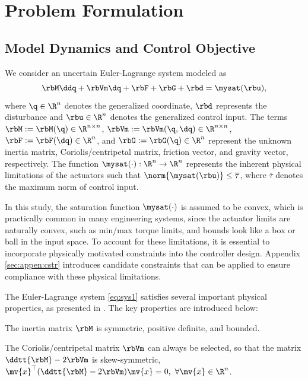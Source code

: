 \documentclass[journal]{IEEEtran}
\begin{document}
\section{Problem Formulation}\label{sec:Problem Formulation}

\subsection{Model Dynamics and Control Objective}

We consider an uncertain Euler-Lagrange system modeled as
\begin{equation}
    \rbM\ddq +\rbVm \dq+ \rbF + \rbG + \rbd
    =
    \mysat(\rbu)
    ,
    \label{eq:sys1}
\end{equation}
where $\q\in \R^n$ denotes the generalized coordinate, $\rbd$ represents the disturbance and $\rbu\in\R^n$ denotes the generalized control input. 
The terms $\rbM:=\rbM(\q)\in\R^{n\times n}$, $\rbVm:=\rbVm(\q,\dq)\in\R^{n\times n}$, $\rbF:=\rbF(\dq)\in\R^{n}$, and $\rbG:=\rbG(\q)\in\R^{n}$ represent the unknown inertia matrix, Coriolis/centripetal matrix, friction vector, and gravity vector, respectively.
The function $\mysat(\cdot):\R^n\to\R^n$ represents the inherent physical limitations of the actuators such that $\norm{\mysat(\rbu)}\le \overline\tau$, where $\overline\tau$ denotes the maximum norm of control input.

In this study, the saturation function $\mysat(\cdot)$ is assumed to be convex, which is practically common in many engineering systems, since the actuator limits are naturally convex, such as min/max torque limits, and bounds look like a box or ball in the input space.
To account for these limitations, it is essential to incorporate physically motivated constraints into the controller design.
Appendix \ref{sec:appen:cstr} introduces candidate constraints that can be applied to ensure compliance with these physical limitations.

The Euler-Lagrange system \eqref{eq:sys1} satisfies several important physical properties, as presented in \cite[Chap. 3 Tab. 3.2.1]{Lewis:1998aa}. 
The key properties are introduced below:
\begin{prop} 
    The inertia matrix $\rbM$ is symmetric, positive definite, and bounded.
    \label{prop:M}
\end{prop}

\begin{prop} 
    The Coriolis/centripetal matrix $\rbVm$ can always be selected, so that the matrix $\ddtt{\rbM}-2\rbVm$ is skew-symmetric, \ie $\mv{x}^\top(\ddtt{\rbM}-2\rbVm)\mv{x}=0,\ \forall \mv{x}\in\R^n$.
    \label{prop:skew}
\end{prop}
\end{document}
